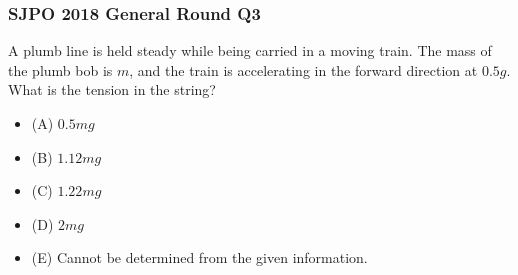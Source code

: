 \documentclass{article}
\begin{document}
\subsubsection{SJPO 2018 General Round Q3}
A plumb line is held steady while being carried in a moving train. The mass of the plumb bob is $m$, and the train is accelerating in the forward direction at $0.5 g$. What is the tension in the string?
\begin{itemize}
\item[] (A) $0.5 mg$
\item[] (B) $1.12 mg$
\item[] (C) $1.22 mg$
\item[] (D) $2 mg$
\item[] (E) Cannot be determined from the given information.
\end{itemize}
\end{document}
